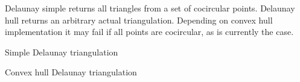 
Delaunay simple returns all triangles from a set of cocircular points.
Delaunay hull returns an arbitrary actual triangulation. Depending on
convex hull implementation it may fail if all points are cocircular,
as is currently the case.

\begin{algorithm}{Simple Delaunay triangulation}
\end{algorithm}

\begin{algorithm}{Convex hull Delaunay triangulation}
\end{algorithm}
